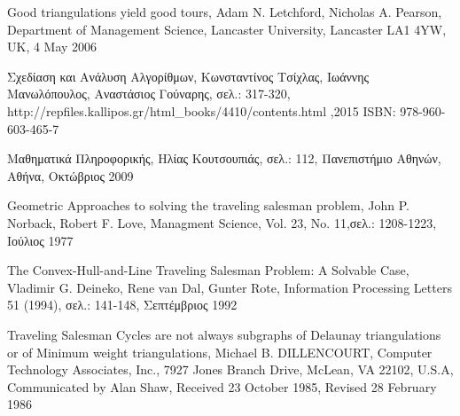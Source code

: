 \documentclass[oneside,12pt]{book}
\theoremstyle{definition}
\begin{document}
\begin{thebibliography}{depth}
	Good triangulations yield good tours,
	Adam N. Letchford, Nicholas A. Pearson,
	Department of Management Science, Lancaster University, Lancaster LA1 4YW, UK, 
	4 May 2006

	Σχεδίαση και Ανάλυση Αλγορίθμων,
	Κωνσταντίνος Τσίχλας, Ιωάννης Μανωλόπουλος, Αναστάσιος Γούναρης,
	σελ.: 317-320,
	http://repfiles.kallipos.gr/html\_books/4410/contents.html ,2015
	ISBN: 978-960-603-465-7
	
	Μαθηματικά Πληροφορικής,
	Ηλίας Κουτσουπιάς,
	σελ.: 112,
	Πανεπιστήμιο Αθηνών, Αθήνα, Οκτώβριος 2009
	
	Geometric Approaches to solving the traveling salesman problem,
	John P. Norback, Robert F. Love,
	Managment Science, Vol. 23, No. 11,σελ.: 1208-1223,
	Ιούλιος 1977
	
	The Convex-Hull-and-Line
	Traveling Salesman Problem: A Solvable Case,
	Vladimir G. Deineko, Rene van Dal, Gunter Rote,
	Information Processing Letters 51 (1994), σελ.: 141-148,
	Σεπτέμβριος 1992
	
	Traveling Salesman Cycles are not always subgraphs of Delaunay triangulations or of Minimum weight triangulations,	Michael B. DILLENCOURT,
	Computer Technology Associates, Inc., 7927 Jones Branch Drive, McLean, VA 22102, U.S.A,
	Communicated by Alan Shaw,
	Received 23 October 1985,
	Revised 28 February 1986
	
\end{thebibliography}
\end{document}
